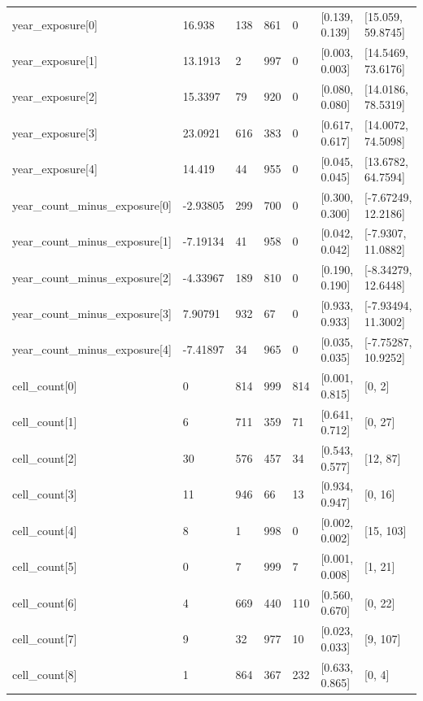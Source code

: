 \begin{longtable}
{}year\_\allowbreak{}exposure[0] & 16.938 & 138 & 861 & 0 & [0.139, 0.139] & [15.059, 59.8745] \\
{}year\_\allowbreak{}exposure[1] & 13.1913 & 2 & 997 & 0 & [0.003, 0.003] & [14.5469, 73.6176] \\
{}year\_\allowbreak{}exposure[2] & 15.3397 & 79 & 920 & 0 & [0.080, 0.080] & [14.0186, 78.5319] \\
{}year\_\allowbreak{}exposure[3] & 23.0921 & 616 & 383 & 0 & [0.617, 0.617] & [14.0072, 74.5098] \\
{}year\_\allowbreak{}exposure[4] & 14.419 & 44 & 955 & 0 & [0.045, 0.045] & [13.6782, 64.7594] \\
{}year\_\allowbreak{}count\_\allowbreak{}minus\_\allowbreak{}exposure[0] & -2.93805 & 299 & 700 & 0 & [0.300, 0.300] & [-7.67249, 12.2186] \\
{}year\_\allowbreak{}count\_\allowbreak{}minus\_\allowbreak{}exposure[1] & -7.19134 & 41 & 958 & 0 & [0.042, 0.042] & [-7.9307, 11.0882] \\
{}year\_\allowbreak{}count\_\allowbreak{}minus\_\allowbreak{}exposure[2] & -4.33967 & 189 & 810 & 0 & [0.190, 0.190] & [-8.34279, 12.6448] \\
{}year\_\allowbreak{}count\_\allowbreak{}minus\_\allowbreak{}exposure[3] & 7.90791 & 932 & 67 & 0 & [0.933, 0.933] & [-7.93494, 11.3002] \\
{}year\_\allowbreak{}count\_\allowbreak{}minus\_\allowbreak{}exposure[4] & -7.41897 & 34 & 965 & 0 & [0.035, 0.035] & [-7.75287, 10.9252] \\
{}cell\_\allowbreak{}count[0] & 0 & 814 & 999 & 814 & [0.001, 0.815] & [0, 2] \\
{}cell\_\allowbreak{}count[1] & 6 & 711 & 359 & 71 & [0.641, 0.712] & [0, 27] \\
{}cell\_\allowbreak{}count[2] & 30 & 576 & 457 & 34 & [0.543, 0.577] & [12, 87] \\
{}cell\_\allowbreak{}count[3] & 11 & 946 & 66 & 13 & [0.934, 0.947] & [0, 16] \\
{}cell\_\allowbreak{}count[4] & 8 & 1 & 998 & 0 & [0.002, 0.002] & [15, 103] \\
{}cell\_\allowbreak{}count[5] & 0 & 7 & 999 & 7 & [0.001, 0.008] & [1, 21] \\
{}cell\_\allowbreak{}count[6] & 4 & 669 & 440 & 110 & [0.560, 0.670] & [0, 22] \\
{}cell\_\allowbreak{}count[7] & 9 & 32 & 977 & 10 & [0.023, 0.033] & [9, 107] \\
{}cell\_\allowbreak{}count[8] & 1 & 864 & 367 & 232 & [0.633, 0.865] & [0, 4] \\

\end{longtable}

